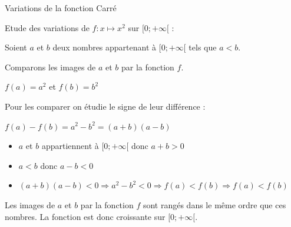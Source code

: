 \begin{pageCours}
\begin{minipage}{0.48\linewidth}
\begin{ThT}{Variations de la fonction Carré}

\end{ThT}

\end{minipage}
\hfill
\begin{minipage}{0.48\linewidth}

\begin{Pv}
Etude des variations de $f:x\mapsto x^2$ sur $[0;+\infty[$ :

Soient $a$ et $b$ deux nombres appartenant à $[0;+\infty[$ tels que $a<b$. 

Comparons les images de $a$ et $b$ par la fonction $f$.

$f(a)=a^2$ et $f(b)=b^2$

Pour les comparer on étudie le signe de leur différence :

$f(a)-f(b)=a^2-b^2=(a+b)(a-b)$

\begin{itemize}
\item $a$ et $b$ appartiennent à $[0;+\infty[$ donc $a+b>0$
\item $a<b$ donc $a-b<0$
\item $(a+b)(a-b)<0\Rightarrow a^2-b^2<0 \Rightarrow f(a)<f(b) \Rightarrow f(a)<f(b)$
\end{itemize}

Les images de $a$ et $b$ par la fonction $f$ sont rangés dans le même ordre que ces nombres. La fonction est donc croissante sur $[0;+\infty[$.

\end{Pv}
\end{minipage}

\end{pageCours} %

